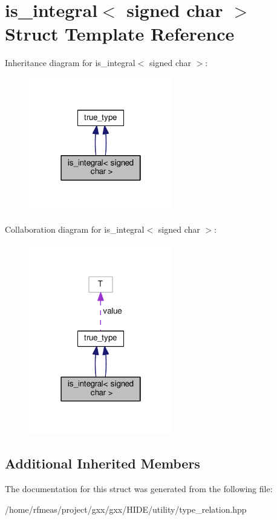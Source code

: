 \hypertarget{structis__integral_3_01signed_01char_01_4}{}\section{is\+\_\+integral$<$ signed char $>$ Struct Template Reference}
\label{structis__integral_3_01signed_01char_01_4}


Inheritance diagram for is\+\_\+integral$<$ signed char $>$\+:
\nopagebreak
\begin{figure}[H]
\begin{center}
\leavevmode
\includegraphics[width=178pt]{structis__integral_3_01signed_01char_01_4__inherit__graph}
\end{center}
\end{figure}


Collaboration diagram for is\+\_\+integral$<$ signed char $>$\+:
\nopagebreak
\begin{figure}[H]
\begin{center}
\leavevmode
\includegraphics[width=178pt]{structis__integral_3_01signed_01char_01_4__coll__graph}
\end{center}
\end{figure}
\subsection*{Additional Inherited Members}


The documentation for this struct was generated from the following file\+:\begin{DoxyCompactItemize}
\item 
/home/rfmeas/project/gxx/gxx/\+H\+I\+D\+E/utility/type\+\_\+relation.\+hpp\end{DoxyCompactItemize}
